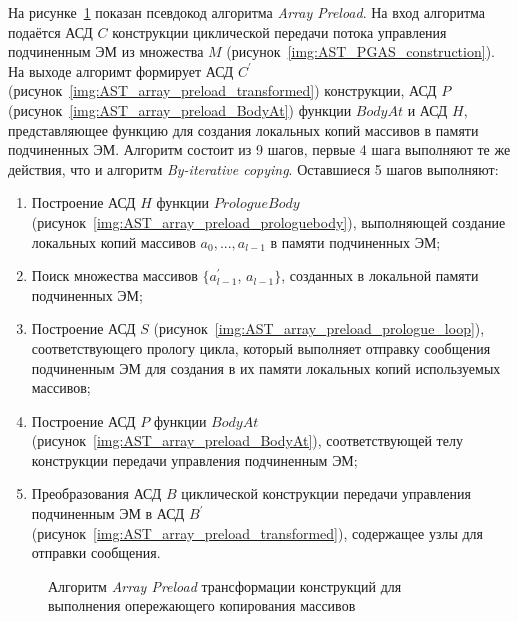 На рисунке~\ref{list:array_preload_transformation} показан псевдокод алгоритма \textit{Array Preload}. На вход алгоритма подаётся АСД $C$ конструкции циклической передачи потока управления подчиненным ЭМ из множества $M$ (рисунок~\ref{img:AST_PGAS_construction}). На выходе алгоримт формирует АСД $C^{\prime}$ (рисунок~\ref{img:AST_array_preload_transformed}) конструкции, АСД $P$ (рисунок~\ref{img:AST_array_preload_BodyAt}) функции $BodyAt$ и АСД $H$, представляющее функцию для создания локальных копий массивов в памяти подчиненных ЭМ. Алгоритм состоит из 9 шагов, первые 4 шага выполняют те же действия, что и алгоритм \textit{By-iterative copying}. Оставшиеся 5 шагов выполняют:
\begin{enumerate}
\item Построение АСД $H$ функции $PrologueBody$ (рисунок~\ref{img:AST_array_preload_prologuebody}), выполняющей создание локальных копий массивов $a_{0},...,a_{l-1}$ в памяти подчиненных ЭМ;
\item Поиск множества массивов $\{a^{\prime}_{l-1}$, $a_{l-1}\}$, созданных в локальной памяти подчиненных ЭМ;
\item Построение АСД $S$ (рисунок~\ref{img:AST_array_preload_prologue_loop}), соответствующего прологу цикла, который выполняет отправку сообщения подчиненным ЭМ для создания в их памяти локальных копий используемых массивов;
\item Построение АСД $P$ функции $BodyAt$ (рисунок~\ref{img:AST_array_preload_BodyAt}), соответствующей телу конструкции передачи управления подчиненным ЭМ;
\item Преобразования АСД $B$ циклической конструкции передачи управления подчиненным ЭМ в АСД $B^{\prime}$ (рисунок~\ref{img:AST_array_preload_transformed}), содержащее узлы для отправки сообщения.
\end{enumerate}

\begin{figure}[!ht]
	
    \caption{Алгоритм \textit{Array Preload} трансформации конструкций для выполнения опережающего копирования массивов}
    \label{list:array_preload_transformation}
\end{figure}

\begin{ListingEnv}[!ht]
  
    \caption{Фрагмент P-программы после применения к PGAS-программе алгоритма \textit{Array Preload} трансформации циклической конструкции передачи потока управления подчиненным ЭМ}
    \label{list:p-program_array_preload}
\end{ListingEnv}

